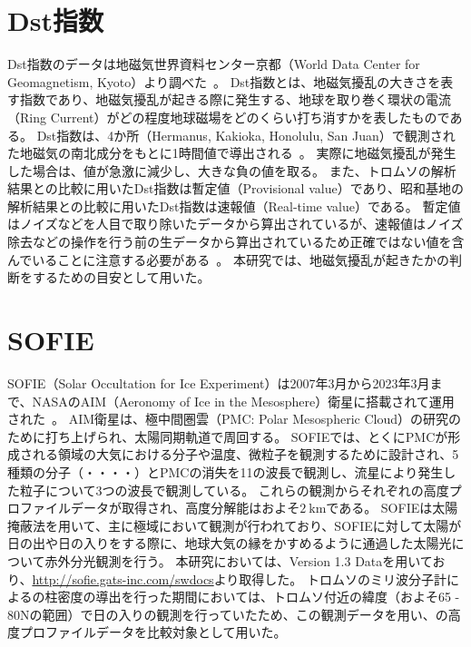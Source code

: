 \chapter{Dst指数}
\label{app:dst}
Dst指数のデータは地磁気世界資料センター京都（World Data Center for Geomagnetism, Kyoto）より調べた~\cite{wdc2022creditdst}。
Dst指数とは、地磁気擾乱の大きさを表す指数であり、地磁気擾乱が起きる際に発生する、地球を取り巻く環状の電流（Ring Current）がどの程度地球磁場をどのくらい打ち消すかを表したものである。
Dst指数は、4か所（Hermanus, Kakioka, Honolulu, San Juan）で観測された地磁気の南北成分をもとに1時間値で導出される~\cite{sugiura1986dst}。
実際に地磁気擾乱が発生した場合は、値が急激に減少し、大きな負の値を取る。
また、トロムソの解析結果との比較に用いたDst指数は暫定値（Provisional value）であり、昭和基地の解析結果との比較に用いたDst指数は速報値（Real-time value）である。
暫定値はノイズなどを人目で取り除いたデータから算出されているが、速報値はノイズ除去などの操作を行う前の生データから算出されているため正確ではない値を含んでいることに注意する必要がある~\cite{wdc2022aedst}。
本研究では、地磁気擾乱が起きたかの判断をするための目安として用いた。


\chapter{SOFIE}
\label{app:sofie}
SOFIE（Solar Occultation for Ice Experiment）は2007年3月から2023年3月まで、NASAのAIM（Aeronomy of Ice in the Mesosphere）衛星に搭載されて運用された~\cite{russell2009aeronomy,sofie2006sdl}。
AIM衛星は、極中間圏雲（PMC: Polar Mesospheric Cloud）の研究のために打ち上げられ、太陽同期軌道で周回する。
SOFIEでは、とくにPMCが形成される領域の大気における分子や温度、微粒子を観測するために設計され、5種類の分子（・・・・）とPMCの消失を11の波長で観測し、流星により発生した粒子について3つの波長で観測している。
これらの観測からそれぞれの高度プロファイルデータが取得され、高度分解能はおよそ$2\ \mathrm{km}$である。
SOFIEは太陽掩蔽法を用いて、主に極域において観測が行われており、SOFIEに対して太陽が日の出や日の入りをする際に、地球大気の縁をかすめるように通過した太陽光について赤外分光観測を行う。
本研究においては、Version 1.3 Dataを用いており、\url{http://sofie.gats-inc.com/swdocs}より取得した。
トロムソのミリ波分子計によるの柱密度の導出を行った期間においては、トロムソ付近の緯度（およそ65 - 80\textdegree Nの範囲）で日の入りの観測を行っていたため、この観測データを用い、の高度プロファイルデータを比較対象として用いた。


